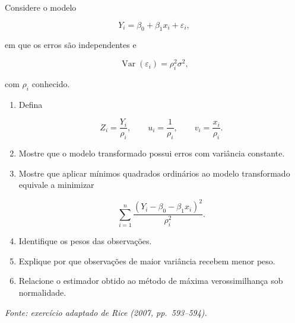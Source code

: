 \documentclass[
  letterpaper,
  DIV=11,
  numbers=noendperiod]{scrreprt}
\begin{document}
\begin{tcolorbox}[enhanced jigsaw, colback=white, leftrule=.75mm, colbacktitle=quarto-callout-tip-color!10!white, breakable, titlerule=0mm, bottomtitle=1mm, title=\textcolor{quarto-callout-tip-color}{\faLightbulb}\hspace{0.5em}{Exercício 7 --- Mínimos quadrados ponderados}, colframe=quarto-callout-tip-color-frame, toprule=.15mm, opacityback=0, bottomrule=.15mm, opacitybacktitle=0.6, arc=.35mm, toptitle=1mm, rightrule=.15mm, coltitle=black, left=2mm]

Considere o modelo

\[Y_i
=
\beta_0+\beta_1x_i+\varepsilon_i,\]

em que os erros são independentes e

\[\operatorname{Var}(\varepsilon_i)
=
\rho_i^2\sigma^2,\]

com \(\rho_i\) conhecido.

\begin{enumerate}
\def\labelenumi{\arabic{enumi}.}
\item
  Defina

  \[Z_i
  =
  \frac{Y_i}{\rho_i},
  \qquad
  u_i
  =
  \frac{1}{\rho_i},
  \qquad
  v_i
  =
  \frac{x_i}{\rho_i}.\]
\item
  Mostre que o modelo transformado possui erros com variância constante.
\item
  Mostre que aplicar mínimos quadrados ordinários ao modelo transformado
  equivale a minimizar

  \[\sum_{i=1}^n
  \frac{
  (Y_i-\beta_0-\beta_1x_i)^2
  }{
  \rho_i^2
  }.\]
\item
  Identifique os pesos das observações.
\item
  Explique por que observações de maior variância recebem menor peso.
\item
  Relacione o estimador obtido ao método de máxima verossimilhança sob
  normalidade.
\end{enumerate}

\emph{Fonte: exercício adaptado de Rice (2007, pp.~593--594).}

\end{tcolorbox}
\end{document}
